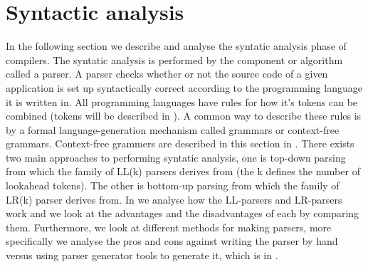 \section{Syntactic analysis}

In the following section we describe and analyse the syntatic analysis phase of
compilers. The syntatic analysis is performed by the component or algorithm
called a parser. A parser checks whether or not the source code of a given
application is set up syntactically correct according to the programming
language it is written in. All programming languages have rules for how it's
tokens can be combined (tokens will be described in ).
A common way to describe these rules is by a formal language-generation
mechanism called grammars or context-free grammars. Context-free grammers are
described in this section in . There exists two
main approaches to performing syntatic analysis, one is top-down parsing from
which the family of LL(k) parsers derives from (the k defines the number of
lookahead tokens). The other is bottom-up parsing from which the family of LR(k)
parser derives from. In  we analyse how the
LL-parsers and LR-parsers work and we look at the advantages and the
disadvantages of each by comparing them. Furthermore, we look at different
methods for making parsers, more specifically we analyse the pros and cons
against writing the parser by hand versus using parser generator tools to
generate it, which is in .





